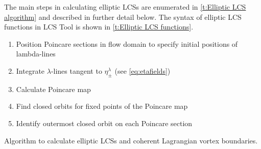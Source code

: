 \documentclass[5p]{elsarticle}
\begin{document}
The main steps in calculating elliptic LCSs are enumerated in \cref{t:Elliptic LCS algorithm} and described in further detail below. The syntax of elliptic LCS functions in LCS Tool is shown in \cref{t:Elliptic LCS functions}.

\begin{table}
\begin{center}
\begin{enumerate}
\item Position Poincare sections in flow domain to specify initial positions of lambda-lines
\item Integrate $\lambda$-lines tangent to $\eta_\pm^\lambda$ (see \cref{eq:etafields})
\item Calculate Poincare map
\item Find closed orbits for fixed points of the Poincare map
\item Identify outermost closed orbit on each Poincare section
\end{enumerate}
\end{center}
\caption{Algorithm to calculate elliptic LCSs and coherent Lagrangian vortex boundaries.}
\label{t:Elliptic LCS algorithm}
\end{table}
\end{document}
